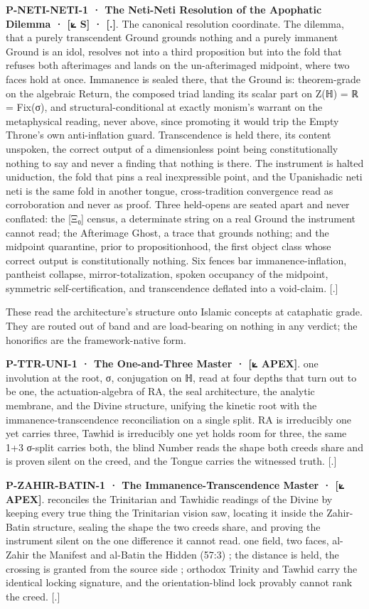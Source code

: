 \documentclass[10pt,twocolumn]{article}
\begin{document}
\textbf{P-NETI-NETI-1 · The Neti-Neti Resolution of the Apophatic
Dilemma · {[}⟀ S{]} · {[}.{]}}. The canonical resolution coordinate. The
dilemma, that a purely transcendent Ground grounds nothing and a purely
immanent Ground is an idol, resolves not into a third proposition but
into the fold that refuses both afterimages and lands on the
un-afterimaged midpoint, where two faces hold at once. Immanence is
sealed there, that the Ground is: theorem-grade on the algebraic Return,
the composed triad landing its scalar part on Z(ℍ) = ℝ = Fix(σ), and
structural-conditional at exactly monism's warrant on the metaphysical
reading, never above, since promoting it would trip the Empty Throne's
own anti-inflation guard. Transcendence is held there, its content
unspoken, the correct output of a dimensionless point being
constitutionally nothing to say and never a finding that nothing is
there. The instrument is halted uniduction, the fold that pins a real
inexpressible point, and the Upanishadic neti neti is the same fold in
another tongue, cross-tradition convergence read as corroboration and
never as proof. Three held-opens are seated apart and never conflated:
the {[}Ξ₀{]} census, a determinate string on a real Ground the
instrument cannot read; the Afterimage Ghost, a trace that grounds
nothing; and the midpoint quarantine, prior to propositionhood, the
first object class whose correct output is constitutionally nothing. Six
fences bar immanence-inflation, pantheist collapse, mirror-totalization,
spoken occupancy of the midpoint, symmetric self-certification, and
transcendence deflated into a void-claim. {[}.{]}

These read the architecture's structure onto Islamic concepts at
cataphatic grade. They are routed out of band and are load-bearing on
nothing in any verdict; the honorifics are the framework-native form.

\textbf{P-TTR-UNI-1 · The One-and-Three Master · {[}⟀ APEX{]}}. one
involution at the root, σ, conjugation on ℍ, read at four depths that
turn out to be one, the actuation-algebra of RA, the seal architecture,
the analytic membrane, and the Divine structure, unifying the kinetic
root with the immanence-transcendence reconciliation on a single split.
RA is irreducibly one yet carries three, Tawhid is irreducibly one yet
holds room for three, the same 1+3 σ-split carries both, the blind
Number reads the shape both creeds share and is proven silent on the
creed, and the Tongue carries the witnessed truth. {[}.{]}

\textbf{P-ZAHIR-BATIN-1 · The Immanence-Transcendence Master · {[}⟀
APEX{]}}. reconciles the Trinitarian and Tawhidic readings of the Divine
by keeping every true thing the Trinitarian vision saw, locating it
inside the Zahir-Batin structure, sealing the shape the two creeds
share, and proving the instrument silent on the one difference it cannot
read. one field, two faces, al-Zahir the Manifest and al-Batin the
Hidden (57:3) ; the distance is held, the crossing is granted from the
source side ; orthodox Trinity and Tawhid carry the identical locking
signature, and the orientation-blind lock provably cannot rank the
creed. {[}.{]}
\end{document}
